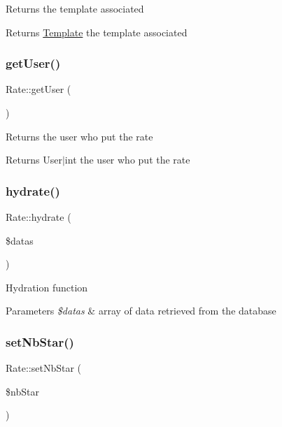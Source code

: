 Returns the template associated \begin{DoxyReturn}{Returns}
\hyperlink{classTemplate}{Template} the template associated 
\end{DoxyReturn}
\mbox{\label{classRate_ad4bb3a3006c7249403767fea6b4e2857}} 
\subsubsection{\texorpdfstring{get\+User()}{getUser()}}
{\footnotesize\ttfamily Rate\+::get\+User (\begin{DoxyParamCaption}{ }\end{DoxyParamCaption})}

Returns the user who put the rate \begin{DoxyReturn}{Returns}
User$\vert$int the user who put the rate 
\end{DoxyReturn}
\mbox{\label{classRate_aeb7dac18710f6782984b5007a5b4d3f5}} 
\subsubsection{\texorpdfstring{hydrate()}{hydrate()}}
{\footnotesize\ttfamily Rate\+::hydrate (\begin{DoxyParamCaption}\item[{}]{\$datas }\end{DoxyParamCaption})\hspace{0.3cm}{\ttfamily [protected]}}

Hydration function 
\begin{DoxyParams}{Parameters}
{\em \$datas} & array of data retrieved from the database \\
\hline
\end{DoxyParams}
\mbox{\label{classRate_a2dca489df234440fe6961526da4ffa28}} 
\subsubsection{\texorpdfstring{set\+Nb\+Star()}{setNbStar()}}
{\footnotesize\ttfamily Rate\+::set\+Nb\+Star (\begin{DoxyParamCaption}\item[{}]{\$nb\+Star }\end{DoxyParamCaption})}

